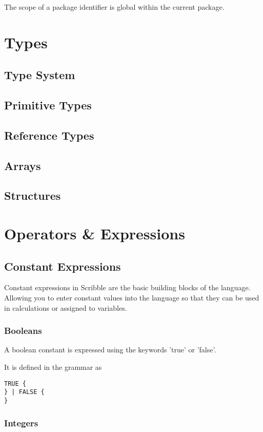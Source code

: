\documentclass[]{final_report}
\begin{document}
The scope of a package identifier is global within the current package.

\chapter{Types}

\section{Type System}
\section{Primitive Types}
\section{Reference Types}
\section{Arrays}
\section{Structures}

\chapter{Operators \& Expressions}

\section{Constant Expressions}

Constant expressions in Scribble are the basic building blocks of the language. Allowing you to enter constant values into the language so that they can be used in calculations or assigned to variables.

\subsection{Booleans}

A boolean constant is expressed using the keywords 'true' or 'false'.

It is defined in the grammar as
\begin{verbatim}
TRUE {
} | FALSE {
}\end{verbatim}

\subsection{Integers}
\end{document}
